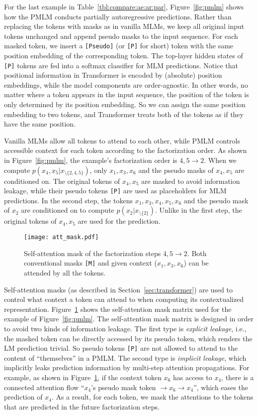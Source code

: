 \documentclass{article}
\newcommand\pmlm{\textsc{PMLM}}
\newcommand{\sptk}[1]{\texttt{[#1]}}
\begin{document}
For the last example in Table~\ref{tbl:compare:ae:ar:par}, Figure~\ref{fig:pmlm} shows how the \pmlm{} conducts partially autoregressive predictions.
Rather than replacing the tokens with masks as in vanilla MLMs, we keep all original input tokens unchanged and append pseudo masks to the input sequence.
For each masked token, we insert a \sptk{Pseudo} (or \sptk{P} for short) token with the same position embedding of the corresponding token. The top-layer hidden states of \sptk{P} tokens are fed into a softmax classifier for MLM predictions.
Notice that positional information in Transformer is encoded by (absolute) position embeddings, while the model components are order-agnostic. In other words, no matter where a token appears in the input sequence, the position of the token is only determined by its position embedding. So we can assign the same position embedding to two tokens, and Transformer treats both of the tokens as if they have the same position.

Vanilla MLMs allow all tokens to attend to each other, while \pmlm{} controls accessible context for each token according to the factorization order.
As shown in Figure~\ref{fig:pmlm}, the example's factorization order is $4,5 \rightarrow 2$.
When we compute $p(x_4,x_5 | x_{\setminus \{2,4,5\}})$, only $x_1,x_3,x_6$ and the pseudo masks of $x_4,x_5$ are conditioned on. The original tokens of $x_4,x_5$ are masked to avoid information leakage, while their pseudo tokens \sptk{P} are used as placeholders for MLM predictions.
In the second step, the tokens $x_1,x_3,x_4,x_5,x_6$ and the pseudo mask of $x_2$ are conditioned on to compute $p(x_2 | x_{\setminus \{2\}})$. Unlike in the first step, the original tokens of $x_4,x_5$ are used for the prediction.


\begin{figure}[t]
\centering
\texttt{[image: att\_mask.pdf]}
\caption{
Self-attention mask of the factorization steps $4,5 \rightarrow 2$.
Both conventional masks \sptk{M} and given context ($x_1,x_3,x_6$) can be attended by all the tokens.
}
\label{fig:att:mask}
\end{figure}


Self-attention masks (as described in Section~\ref{sec:transformer}) are used to control what context a token can attend to when computing its contextualized representation.
Figure~\ref{fig:att:mask} shows the self-attention mask matrix used for the example of Figure~\ref{fig:pmlm}.
The self-attention mask matrix is designed in order to avoid two kinds of information leakage.
The first type is \textit{explicit leakage}, i.e., the masked token can be directly accessed by its pseudo token, which renders the LM prediction trivial. So pseudo tokens \sptk{P} are not allowed to attend to the content of ``themselves'' in a \pmlm{}.
The second type is \textit{implicit leakage}, which implicitly leaks prediction information by multi-step attention propagations.
For example, as shown in Figure~\ref{fig:att:mask}, if the context token $x_6$ has access to $x_4$, there is a connected attention flow ``$x_4$'s pseudo mask token $\rightarrow x_6 \rightarrow x_4$'', which eases the prediction of $x_4$.
As a result, for each token, we mask the attentions to the tokens that are predicted in the future factorization steps.
\end{document}
